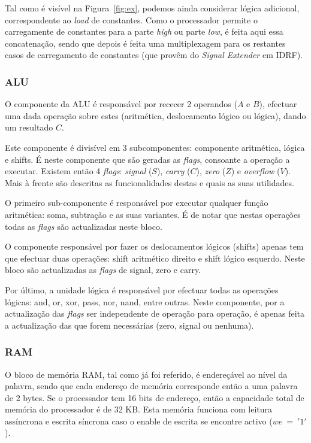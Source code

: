 \documentclass[a4paper]{article}
\begin{document}
			Tal como é visível na Figura~\ref{fig:ex}, podemos ainda considerar lógica adicional, correspondente ao \textit{load} de constantes. Como o processador permite o carregamente de constantes para a parte \textit{high} ou parte \textit{low}, é feita aqui essa concatenação, sendo que depois é feita uma multiplexagem para os restantes casos de carregamento de constantes (que provêm do \textit{Signal Extender} em IDRF).
		
			\subsubsection{ALU}
				
				O componente da ALU é responsável por rececer 2 operandos ($A$ e $B$), efectuar uma dada operação sobre estes (aritmética, deslocamento lógico ou lógica), dando um resultado $C$.
				
				Este componente é divisível em 3 subcomponentes: componente aritmética, lógica e shifts. É neste componente que são geradas as \textit{flags}, consoante a operação a executar. Existem então 4 \textit{flags}: \textit{signal} ($S$), \textit{carry} ($C$), \textit{zero} ($Z$) e \textit{overflow} ($V$). Mais à frente são descritas as funcionalidades destas e quais as suas utilidades.
				
				O primeiro sub-componente é responsável por executar qualquer função aritmética: soma, subtração e as suas variantes. É de notar que nestas operações todas as \textit{flags} são actualizadas neste bloco.
				
				O componente responsável por fazer os deslocamentos lógicos (shifts) apenas tem que efectuar duas operações: shift aritmético direito e shift lógico esquerdo. Neste bloco são actualizadas as \textit{flags} de signal, zero e carry.
				
				Por último, a unidade lógica é responsável por efectuar todas as operações lógicas: and, or, xor, pass, nor, nand, entre outras. Neste componente, por a actualização das \textit{flags} ser independente de operação para operação, é apenas feita a actualização das que forem necessárias (zero, signal ou nenhuma).
			
			\subsubsection{RAM}
				
				O bloco de memória RAM, tal como já foi referido, é endereçável ao nível da palavra, sendo que cada endereço de memória corresponde então a uma palavra de 2 bytes. Se o processador tem 16 bits de endereço, então a capacidade total de memória do processador é de 32 KB. Esta memória funciona com leitura assíncrona e escrita síncrona caso o enable de escrita se encontre activo ($we~=~'1'$).
				
\end{document}
